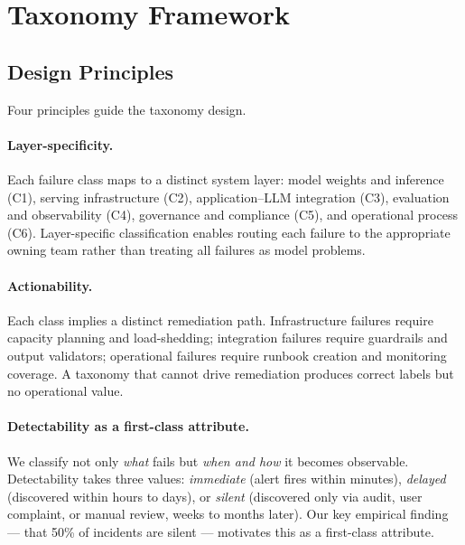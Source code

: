 \documentclass{article}
\begin{document}
\section{Taxonomy Framework}
\label{sec:taxonomy}

\subsection{Design Principles}

Four principles guide the taxonomy design.

\paragraph{Layer-specificity.}
Each failure class maps to a distinct system layer: model weights and inference
(C1), serving infrastructure (C2), application--LLM integration (C3), evaluation
and observability (C4), governance and compliance (C5), and operational process
(C6).  Layer-specific classification enables routing each failure to the
appropriate owning team rather than treating all failures as model problems.

\paragraph{Actionability.}
Each class implies a distinct remediation path.  Infrastructure failures require
capacity planning and load-shedding; integration failures require guardrails and
output validators; operational failures require runbook creation and monitoring
coverage.  A taxonomy that cannot drive remediation produces correct labels but
no operational value.

\paragraph{Detectability as a first-class attribute.}
We classify not only \emph{what} fails but \emph{when and how} it becomes
observable.  Detectability takes three values: \emph{immediate} (alert fires
within minutes), \emph{delayed} (discovered within hours to days), or
\emph{silent} (discovered only via audit, user complaint, or manual review,
weeks to months later).  Our key empirical finding --- that 50\% of incidents
are silent --- motivates this as a first-class attribute.
\end{document}
